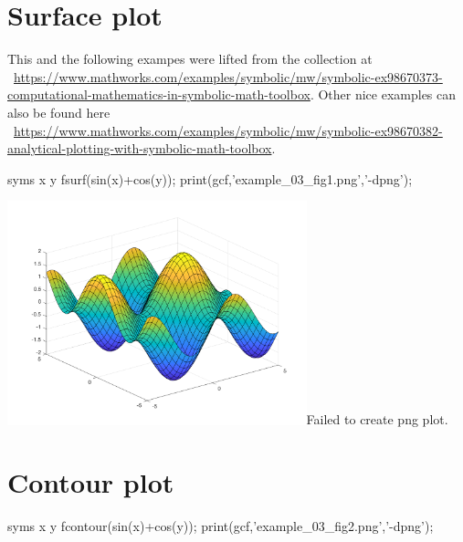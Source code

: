 \documentclass[12pt]{matlatex}
\begin{document}
\section*{Surface plot}

This and the following exampes were lifted from the collection at%
\ \url{https://www.mathworks.com/examples/symbolic/mw/symbolic-ex98670373-computational-mathematics-in-symbolic-math-toolbox}.
Other nice examples can also be found here%
\ \url{https://www.mathworks.com/examples/symbolic/mw/symbolic-ex98670382-analytical-plotting-with-symbolic-math-toolbox}.

\begin{matlab}
   syms x y
   fsurf(sin(x)+cos(y));
   print(gcf,'example_03_fig1.png','-dpng');
\end{matlab}

\begin{minipage}{\textwidth}
   \centering
   {\includegraphics[width=0.65\textwidth]{example_03_fig1.png}}{Failed to create png plot.}
\end{minipage}

\clearpage

\section*{Contour plot}

\begin{matlab}
   syms x y
   fcontour(sin(x)+cos(y));
   print(gcf,'example_03_fig2.png','-dpng');
\end{matlab}
\end{document}
